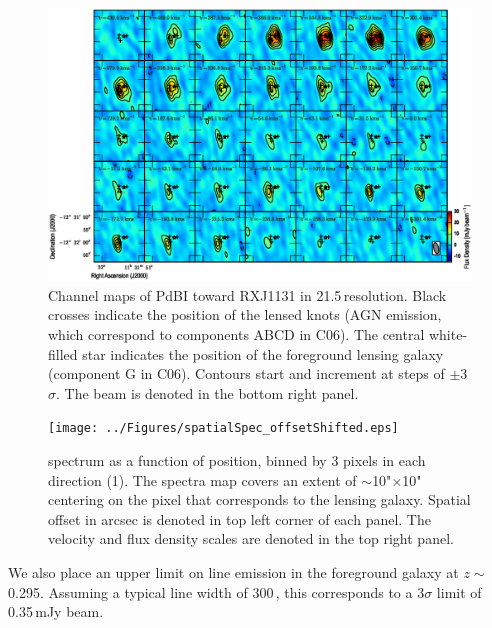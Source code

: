 \documentclass[]{emulateapj}
\begin{document}
\begin{figure}[!htbp]
\centering
\includegraphics[width=1.0\textwidth]{../Figures/co_channel_maps.eps}
\caption{
Channel maps of PdBI \bco toward RXJ1131 in 21.5\,\kms resolution.
Black crosses indicate the position of the lensed knots (AGN emission,
which correspond to components ABCD in C06). The central white-filled
star indicates the position of the foreground lensing galaxy (component G
in C06). Contours start and increment at steps of
$\pm$3$\sigma$. The beam is denoted in the bottom right panel. \label{fig:chanmap}}
\end{figure}

\begin{figure}[!htbp]
\centering
\texttt{[image: ../Figures/spatialSpec\_offsetShifted.eps]}
\caption{
\bco spectrum as a function of position, binned by 3 pixels in each
direction (1).
The spectra map covers an extent of $\sim$10"$\times$10"
centering on the pixel that corresponds to the lensing galaxy.
Spatial offset in arcsec is denoted in top left corner of each panel.
The velocity and flux density scales are denoted in the top right panel.
\label{fig:spatialSpec}}
\end{figure}

We also place an upper limit on  line emission
in the foreground galaxy at $z\sim$0.295.
Assuming a typical line width of 300\,\kms, this corresponds to a 3$\sigma$
limit of 0.35\,mJy\,\kms\,beam\pmOne.
\end{document}

